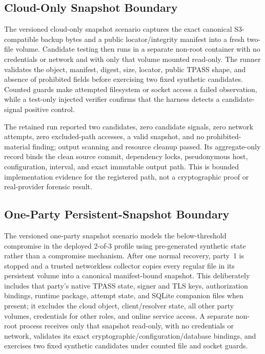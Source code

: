 \documentclass[sigconf,anonymous]{acmart}
\begin{document}
\subsection{Cloud-Only Snapshot Boundary}
\label{subsec:cloud-snapshot-eval}

The versioned cloud-only snapshot scenario captures the exact canonical S3-compatible backup bytes and a public locator/integrity manifest into a fresh two-file volume. Candidate testing then runs in a separate non-root container with no credentials or network and with only that volume mounted read-only. The runner validates the object, manifest, digest, size, locator, public TPASS shape, and absence of prohibited fields before exercising two fixed synthetic candidates. Counted guards make attempted filesystem or socket access a failed observation, while a test-only injected verifier confirms that the harness detects a candidate-signal positive control.

The retained run reported two candidates, zero candidate signals, zero network attempts, zero excluded-path accesses, a valid snapshot, and no prohibited-material finding; output scanning and resource cleanup passed. Its aggregate-only record binds the clean source commit, dependency locks, pseudonymous host, configuration, interval, and exact immutable output path. This is bounded implementation evidence for the registered path, not a cryptographic proof or real-provider forensic result.

\subsection{One-Party Persistent-Snapshot Boundary}
\label{subsec:party-snapshot-eval}

The versioned one-party snapshot scenario models the below-threshold compromise
in the deployed 2-of-3 profile using pre-generated synthetic state rather than
a compromise mechanism. After one normal recovery, party~1 is stopped and a
trusted networkless collector copies every regular file in its persistent
volume into a canonical manifest-bound snapshot. This deliberately includes
that party's native TPASS state, signer and TLS keys, authorization bindings,
runtime package, attempt state, and SQLite companion files when present; it
excludes the cloud object, client/resolver state, all other party volumes,
credentials for other roles, and online service access. A separate non-root
process receives only that snapshot read-only, with no credentials or network,
validates its exact cryptographic/configuration/database bindings, and exercises
two fixed synthetic candidates under counted file and socket guards.
\end{document}
